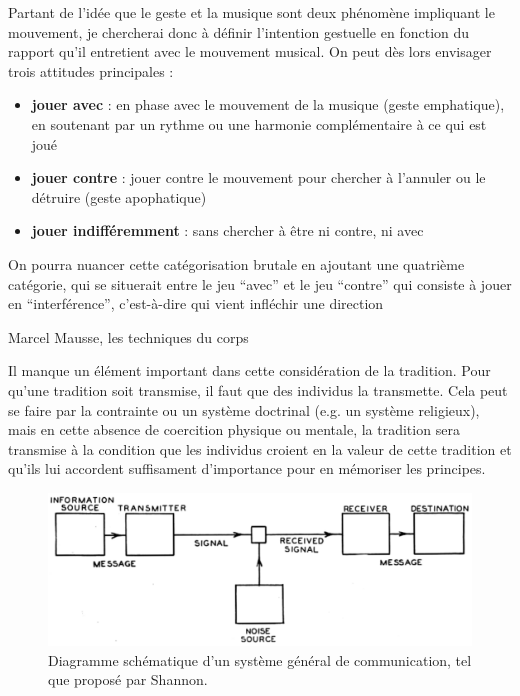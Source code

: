 Partant de l'idée que le geste et la musique sont deux phénomène impliquant le mouvement, je chercherai donc à définir l'intention gestuelle en fonction du rapport qu'il entretient avec le mouvement musical.
On peut dès lors envisager trois attitudes principales :
\vspace{-1em}
\begin{itemize}[noitemsep]
\item \textbf{jouer avec} : en phase avec le mouvement de la musique (geste emphatique), en soutenant par un rythme ou une harmonie complémentaire à ce qui est joué
\item \textbf{jouer contre} : jouer contre le mouvement pour chercher à l'annuler ou le détruire (geste apophatique)
\item \textbf{jouer indifféremment} : sans chercher à être ni contre, ni avec
\end{itemize}

On pourra nuancer cette catégorisation brutale en ajoutant une quatrième catégorie, qui se situerait entre 
le jeu ``avec'' et le jeu ``contre'' qui consiste à jouer en ``interférence'', c'est-à-dire qui vient infléchir une direction


 Marcel Mausse, les techniques du corps

Il manque un élément important dans cette considération de la tradition. Pour qu'une tradition soit transmise, il faut que des individus la transmette. Cela peut se faire par la contrainte ou un système doctrinal (e.g. un système religieux), mais en cette absence de coercition physique ou mentale, la tradition sera transmise à la condition que les individus croient en la valeur de cette tradition et qu'ils lui accordent suffisament d'importance pour en mémoriser les principes.


\begin{figure}[!htbp]
	\includegraphics[width=\textwidth]{gfx/03_gesture/ShannonCommunicationSystem.png}
	\caption{Diagramme schématique d'un système général de communication, tel que proposé par Shannon.}
	\label{fig:gesture:shannon}
\end{figure}



